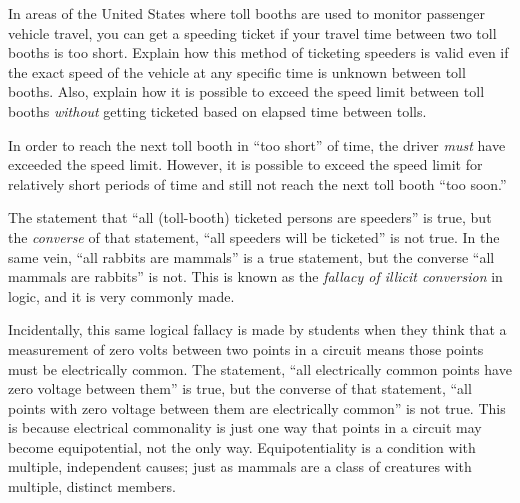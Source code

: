 

In areas of the United States where toll booths are used to monitor passenger vehicle travel, you can get a speeding ticket if your travel time between two toll booths is too short.  Explain how this method of ticketing speeders is valid even if the exact speed of the vehicle at any specific time is unknown between toll booths.  Also, explain how it is possible to exceed the speed limit between toll booths {\it without} getting ticketed based on elapsed time between tolls.







In order to reach the next toll booth in ``too short'' of time, the driver {\it must} have exceeded the speed limit.  However, it is possible to exceed the speed limit for relatively short periods of time and still not reach the next toll booth ``too soon.''







The statement that ``all (toll-booth) ticketed persons are speeders'' is true, but the {\it converse} of that statement, ``all speeders will be ticketed'' is not true.  In the same vein, ``all rabbits are mammals'' is a true statement, but the converse ``all mammals are rabbits'' is not.  This is known as the {\it fallacy of illicit conversion} in logic, and it is very commonly made.

Incidentally, this same logical fallacy is made by students when they think that a measurement of zero volts between two points in a circuit means those points must be electrically common.  The statement, ``all electrically common points have zero voltage between them'' is true, but the converse of that statement, ``all points with zero voltage between them are electrically common'' is not true.  This is because electrical commonality is just one way that points in a circuit may become equipotential, not the only way.  Equipotentiality is a condition with multiple, independent causes; just as mammals are a class of creatures with multiple, distinct members.




